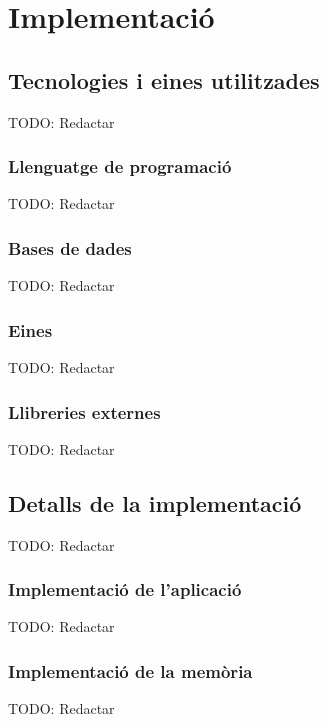 
\chapter{Implementació} %

\label{Chapter7} %


\section{Tecnologies i eines utilitzades}

TODO: Redactar

\subsection{Llenguatge de programació}

TODO: Redactar

\subsection{Bases de dades}

TODO: Redactar

\subsection{Eines}

TODO: Redactar

\subsection{Llibreries externes}

TODO: Redactar


\section{Detalls de la implementació}

TODO: Redactar

\subsection{Implementació de l'aplicació}

TODO: Redactar

\subsection{Implementació de la memòria}

TODO: Redactar

